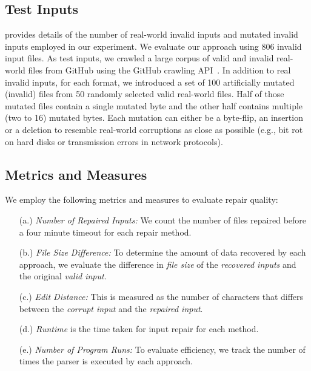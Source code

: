 \documentclass[acmsmall,screen,review,anonymous]{acmart}
\begin{document}
\subsection{Test Inputs} 
 provides details of the number of
real-world invalid inputs and mutated invalid inputs employed in our experiment.
We evaluate our approach using 806 invalid input files. %
As test inputs, we crawled a large corpus of valid and invalid real-world files
from GitHub using the GitHub crawling API~\cite{githubapi}. 
In addition to real invalid inputs, for each format, we introduced a set of 100 artificially mutated (invalid) files
from 50 randomly selected valid real-world files.
Half of those mutated files contain a single mutated byte and the other half
contains multiple (two to 16) mutated bytes.
Each mutation can either be a byte-flip, an insertion or a deletion to 
resemble real-world corruptions as close as possible
(e.g., bit rot on hard disks or transmission errors in network protocols).


\subsection{Metrics and Measures} We employ the following metrics and measures to evaluate repair quality: 

\begin{itemize}

\item[(a.)] \textit{Number of Repaired Inputs:} We count the number of files repaired before
a four minute timeout for each repair method.
 
\item[(b.)]  \textit{File Size Difference:} To determine the amount of data recovered by each approach, 
we evaluate the difference in \emph{file size} of
the \emph{recovered inputs} and the original
\emph{valid input}. %

\item[(c.)]  \textit{Edit Distance:} This is measured as the number of characters that
differs between the \emph{corrupt input} and the \emph{repaired input}.

\item[(d.)]  \textit{Runtime} is the time taken for input repair for each method.

\item[(e.)]  \textit{Number of Program Runs:} To evaluate efficiency, we track the number of times the parser is executed by each approach. 

\end{itemize}
\end{document}
